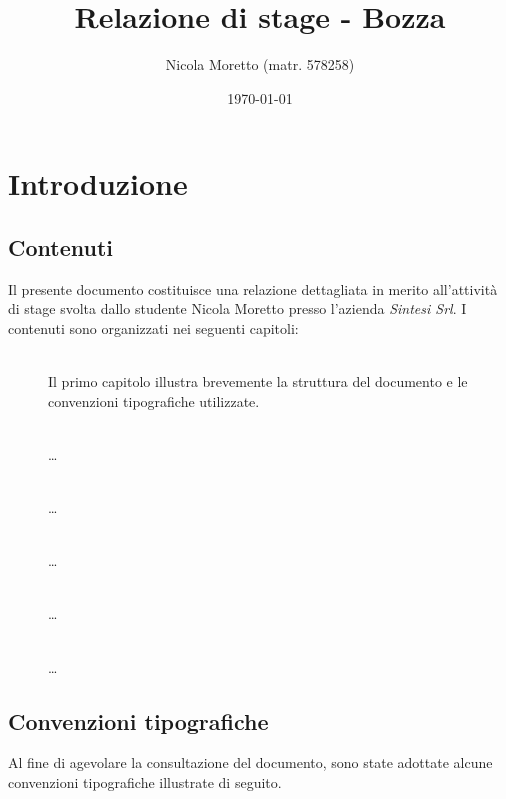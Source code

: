 \documentclass[11pt,a4paper,headsepline,hidelinks]{scrreprt} %
\begin{document}
    \title{Relazione di stage - Bozza}
	\subject{Analisi e progettazione di un'interfaccia grafica per la consultazione dei contenuti informativi in una piattaforma web tematica}
    \author{Nicola Moretto (matr. 578258)}
    \date{\today}

    \maketitle

	\tableofcontents

	\listoffigures
	\begingroup
	\let\clearpage\relax
	\listoftables
	\endgroup

	\chapter{Introduzione}
	\label{ch:tesi:intro}

	\section{Contenuti}
	Il presente documento costituisce una relazione dettagliata in merito all'attività di stage svolta dallo studente Nicola Moretto presso l'azienda \textit{Sintesi Srl}. I contenuti sono organizzati nei seguenti capitoli:
	\begin{description}
	  \item[] \hfill \\
	  Il primo capitolo illustra brevemente la struttura del documento e le convenzioni tipografiche utilizzate.
	  \item[] \hfill \\
	  \ldots
	  \item[] \hfill \\
	  \ldots
	  \item[] \hfill \\
	  \ldots
	  \item[] \hfill \\
	  \ldots
	  \item[] \hfill \\
	  \ldots
	\end{description}

	\section{Convenzioni tipografiche}
	Al fine di agevolare la consultazione del documento, sono state adottate alcune convenzioni tipografiche illustrate di seguito.
	
\end{document}
